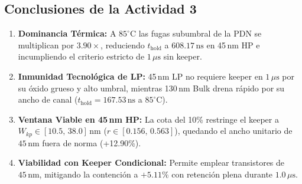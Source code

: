 \subsection{Conclusiones de la Actividad 3}
\begin{enumerate}[leftmargin=1.4em,itemsep=0.0em]
  \item \textbf{Dominancia Térmica:} A $85^\circ\text{C}$ las fugas subumbral de la PDN se multiplican por $3.90\times$, reduciendo $t_{\text{hold}}$ a $608.17\,\text{ns}$ en 45\,nm HP e incumpliendo el criterio estricto de $1\,\mu\text{s}$ sin keeper.
  \item \textbf{Inmunidad Tecnológica de LP:} 45\,nm LP no requiere keeper en $1\,\mu\text{s}$ por su óxido grueso y alto umbral, mientras 130\,nm Bulk drena rápido por su ancho de canal ($t_{\text{hold}} = 167.53\,\text{ns}$ a $85^\circ\text{C}$).
  \item \textbf{Ventana Viable en 45\,nm HP:} La cota del 10\% restringe el keeper a $W_{kp} \in [10.5,\, 38.0]\,\text{nm}$ ($r \in [0.156,\, 0.563]$), quedando el ancho unitario de $45\,\text{nm}$ fuera de norma (+12.90\%).
  \item \textbf{Viabilidad con Keeper Condicional:} Permite emplear transistores de $45\,\text{nm}$, mitigando la contención a $+5.11\%$ con retención plena durante $1.0\,\mu\text{s}$.
\end{enumerate}
